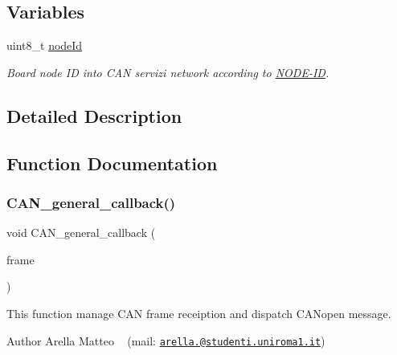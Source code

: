 \subsection*{Variables}
\begin{DoxyCompactItemize}
\item 
\mbox{\label{group___c_a_n__network__module_gafe80bdea5c10c0d32fb3261a4e513fa9}} 
uint8\+\_\+t \mbox{\hyperlink{group___c_a_n__network__module_gafe80bdea5c10c0d32fb3261a4e513fa9}{node\+Id}}
\begin{DoxyCompactList}\small\item\em Board node ID into C\+AN servizi network according to \mbox{\hyperlink{_c_a_n_network_page_NODE-ID}{N\+O\+D\+E-\/\+ID}}. \end{DoxyCompactList}\end{DoxyCompactItemize}


\subsection{Detailed Description}


\subsection{Function Documentation}
\mbox{\label{group___c_a_n__network__module_ga1b1534e44c5652543946053ad1aea5d1}} 
\subsubsection{\texorpdfstring{C\+A\+N\+\_\+general\+\_\+callback()}{CAN\_general\_callback()}}
{\footnotesize\ttfamily void C\+A\+N\+\_\+general\+\_\+callback (\begin{DoxyParamCaption}\item[{C\+A\+N\+\_\+\+F\+R\+A\+ME $\ast$}]{frame }\end{DoxyParamCaption})}



This function manage C\+AN frame receiption and dispatch C\+A\+Nopen message. 

\begin{DoxyAuthor}{Author}
Arella Matteo ~\newline
 (mail\+: \href{mailto:arella.1646983@studenti.uniroma1.it}{\tt arella.@studenti.\+uniroma1.\+it})
\end{DoxyAuthor}

